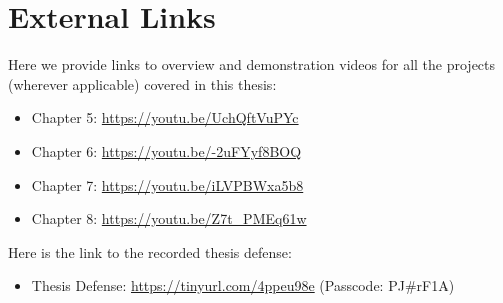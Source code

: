 \documentclass[a4paper]{report}
\begin{document}
\section{External Links}
Here we provide links to overview and demonstration videos for all the projects (wherever applicable) covered in this thesis:

\begin{itemize}
\item Chapter 5: \url{https://youtu.be/UchQftVuPYc}
\item Chapter 6: \url{https://youtu.be/-2uFYyf8BOQ}
\item Chapter 7: \url{https://youtu.be/iLVPBWxa5b8}
\item Chapter 8: \url{https://youtu.be/Z7t_PMEq61w}
\end{itemize}

Here is the link to the recorded thesis defense:
\begin{itemize}
\item Thesis Defense: \url{https://tinyurl.com/4ppeu98e} (Passcode: PJ\#rF1A$\hat{}$)
\end{itemize}



\end{document}
